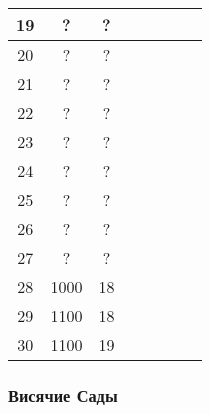 \begin{longtable}[c]{|c|c|c|c|c|c|c|c|}
    \multirow{1}{*}{19} & \multirow{1}{*}{?} & \multirow{1}{*}{?} & & & & & \\\hline
    \multirow{1}{*}{20} & \multirow{1}{*}{?} & \multirow{1}{*}{?} & & & & & \\\hline
    \multirow{1}{*}{21} & \multirow{1}{*}{?} & \multirow{1}{*}{?} & & & & & \\\hline
    \multirow{1}{*}{22} & \multirow{1}{*}{?} & \multirow{1}{*}{?} & & & & & \\\hline
    \multirow{1}{*}{23} & \multirow{1}{*}{?} & \multirow{1}{*}{?} & & & & & \\\hline
    \multirow{1}{*}{24} & \multirow{1}{*}{?} & \multirow{1}{*}{?} & & & & & \\\hline
    \multirow{1}{*}{25} & \multirow{1}{*}{?} & \multirow{1}{*}{?} & & & & & \\\hline
    \multirow{1}{*}{26} & \multirow{1}{*}{?} & \multirow{1}{*}{?} & & & & & \\\hline
    \multirow{1}{*}{27} & \multirow{1}{*}{?} & \multirow{1}{*}{?} & & & & & \\\hline
    \multirow{1}{*}{28} & \multirow{1}{*}{1000} & \multirow{1}{*}{18} & & & & & \\\hline
    \multirow{1}{*}{29} & \multirow{1}{*}{1100} & \multirow{1}{*}{18} & & & & & \\\hline
    \multirow{1}{*}{30} & \multirow{1}{*}{1100} & \multirow{1}{*}{19} & & & & & \\\hline
\end{longtable}


\subsubsection{Висячие Сады}


